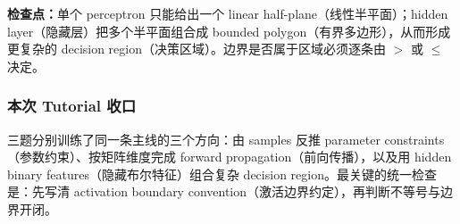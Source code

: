 \textbf{检查点：}单个 perceptron 只能给出一个 linear half-plane（线性半平面）；hidden layer（隐藏层）把多个半平面组合成 bounded polygon（有界多边形），从而形成更复杂的 decision region（决策区域）。边界是否属于区域必须逐条由 $>$ 或 $\le$ 决定。

\subsubsection*{本次 Tutorial 收口}

三题分别训练了同一条主线的三个方向：由 samples 反推 parameter constraints（参数约束）、按矩阵维度完成 forward propagation（前向传播），以及用 hidden binary features（隐藏布尔特征）组合复杂 decision region。最关键的统一检查是：先写清 activation boundary convention（激活边界约定），再判断不等号与边界开闭。
